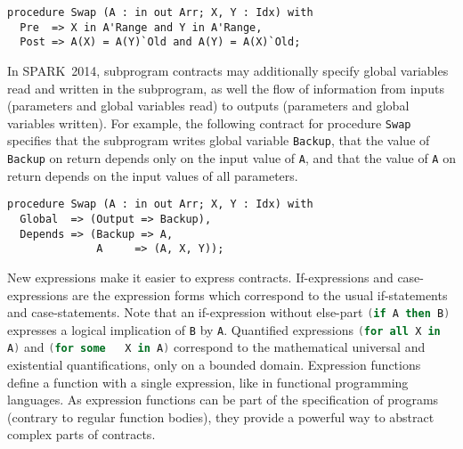 \documentclass[10pt,a4paper,twocolumn]{article}
\newcommand{\newspark}{SPARK~2014\xspace}
\newcommand{\SPARK}[1]{\lstinline[language=Ada,basicstyle={\footnotesize
      \sffamily},framesep=0pt]$#1$}
\begin{document}
\begin{lstlisting}
procedure Swap (A : in out Arr; X, Y : Idx) with
  Pre  => X in A'Range and Y in A'Range,
  Post => A(X) = A(Y)`Old and A(Y) = A(X)`Old;
\end{lstlisting}

In \newspark, subprogram contracts may additionally specify global variables
read and written in the subprogram, as well the flow of information from inputs
(parameters and global variables read) to outputs (parameters and global
variables written). For example, the following contract for procedure
\SPARK{Swap} specifies that the subprogram writes global variable
\SPARK{Backup}, that the value of \SPARK{Backup} on return depends only on the
input value of \SPARK{A}, and that the value of \SPARK{A} on return depends on
the input values of all parameters.

\begin{lstlisting}
procedure Swap (A : in out Arr; X, Y : Idx) with
  Global  => (Output => Backup),
  Depends => (Backup => A,
              A     => (A, X, Y));
\end{lstlisting}



New expressions make it easier to express contracts. If-expressions and
case-expressions are the expression forms which correspond to the usual
if-statements and case-statements. Note that an if-expression without else-part
\SPARK{(if A then B)} expresses a logical implication of \SPARK{B} by
\SPARK{A}. Quantified expressions \SPARK{(for all X in A)} and \SPARK{(for some
  X in A)} correspond to the mathematical universal and existential
quantifications, only on a bounded domain. Expression functions define a
function with a single expression, like in functional programming languages. As
expression functions can be part of the specification of programs (contrary to
regular function bodies), they provide a powerful way to abstract complex parts
of contracts.
\end{document}
